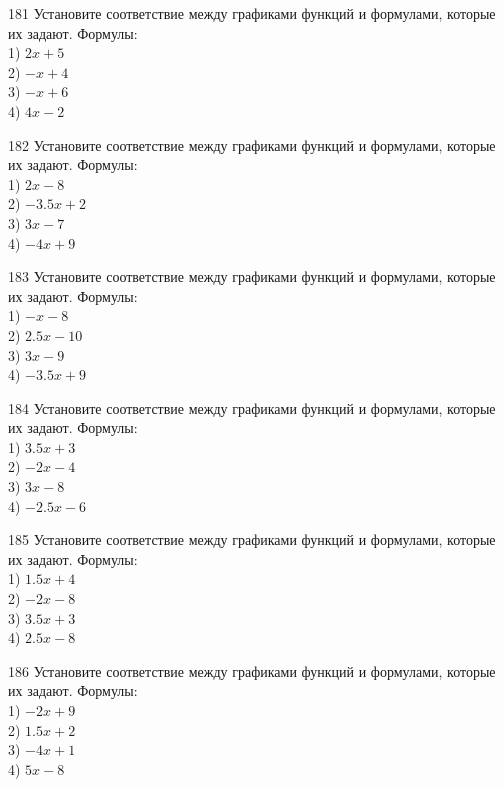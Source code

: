 \documentclass[4apaper]{article}
\begin{document}
\begin{taskBN}{181}
Установите соответствие между графиками функций и формулами, которые их задают. Формулы: \\1) $2x+5$\\2) $-x+4$\\3) $-x+6$\\4) $4x-2$
\end{taskBN}

\begin{taskBN}{182}
Установите соответствие между графиками функций и формулами, которые их задают. Формулы: \\1) $2x-8$\\2) $-3.5x+2$\\3) $3x-7$\\4) $-4x+9$
\end{taskBN}

\begin{taskBN}{183}
Установите соответствие между графиками функций и формулами, которые их задают. Формулы: \\1) $-x-8$\\2) $2.5x-10$\\3) $3x-9$\\4) $-3.5x+9$
\end{taskBN}

\begin{taskBN}{184}
Установите соответствие между графиками функций и формулами, которые их задают. Формулы: \\1) $3.5x+3$\\2) $-2x-4$\\3) $3x-8$\\4) $-2.5x-6$
\end{taskBN}

\begin{taskBN}{185}
Установите соответствие между графиками функций и формулами, которые их задают. Формулы: \\1) $1.5x+4$\\2) $-2x-8$\\3) $3.5x+3$\\4) $2.5x-8$
\end{taskBN}

\begin{taskBN}{186}
Установите соответствие между графиками функций и формулами, которые их задают. Формулы: \\1) $-2x+9$\\2) $1.5x+2$\\3) $-4x+1$\\4) $5x-8$
\end{taskBN}
\end{document}
